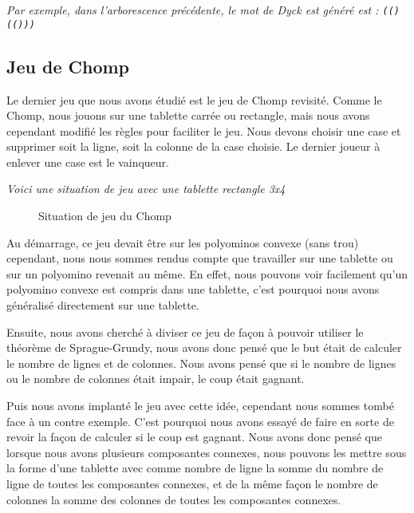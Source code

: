   \textit{Par exemple, dans l'arborescence précédente, le mot de Dyck est généré est : \texttt{(()(()))}}

\subsection{Jeu de Chomp}
\label{sub:Jeu de Chomp}

Le dernier jeu que nous avons étudié est le jeu de Chomp revisité. Comme le Chomp, nous jouons sur une tablette carrée ou rectangle, mais nous avons cependant modifié les règles pour faciliter le jeu. Nous devons choisir une case et supprimer soit la ligne, soit la colonne de la case choisie. Le dernier joueur à enlever une case est le vainqueur.

\textit{
  Voici une situation de jeu avec une tablette rectangle 3x4
}

\begin{figure}[h]
  \centering
  \caption{Situation de jeu du Chomp}
 
\end{figure}
Au démarrage, ce jeu devait être sur les polyominos convexe (sans trou) cependant, nous nous sommes rendus compte que travailler sur une tablette ou sur un polyomino revenait au même. En effet, nous pouvons voir facilement qu'un polyomino convexe est compris dans une tablette, c'est pourquoi nous avons généralisé directement sur une tablette.

Ensuite, nous avons cherché à diviser ce jeu de façon à pouvoir utiliser le théorème de Sprague-Grundy, nous avons donc pensé que le but était de calculer le nombre de lignes et de colonnes. Nous avons pensé que si le nombre de lignes ou le nombre de colonnes était impair, le coup était gagnant.

Puis nous avons implanté le jeu avec cette idée, cependant nous sommes tombé face à un contre exemple. C'est pourquoi nous avons essayé de faire en sorte de revoir la façon de calculer si le coup est gagnant. Nous avons donc pensé que lorsque nous avons plusieurs composantes connexes, nous pouvons les mettre sous la forme d'une tablette avec comme nombre de ligne la somme du nombre de ligne de toutes les composantes connexes, et de la même façon le nombre de colonnes la somme des colonnes de toutes les composantes connexes.

